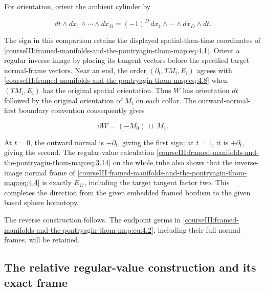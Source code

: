 For orientation, orient the ambient cylinder by

\begin{equation}
dt\wedge dx_1\wedge\cdots\wedge dx_D
   =(-1)^D\,dx_1\wedge\cdots\wedge dx_D\wedge dt.
 \label{courseIII:framed-manifolds-and-the-pontryagin-thom-map:eq:4.8}
\end{equation}

The sign in this comparison retains the displayed spatial-then-time coordinates of \eqref{courseIII:framed-manifolds-and-the-pontryagin-thom-map:eq:4.1}. Orient a regular inverse image by placing its tangent vectors before the specified target normal-frame vectors. Near an end, the order \((\partial_t,TM_i,E_i)\) agrees with \eqref{courseIII:framed-manifolds-and-the-pontryagin-thom-map:eq:4.8} when \((TM_i,E_i)\) has the original spatial orientation. Thus \(W\) has orientation \(dt\) followed by the original orientation of \(M_i\) on each collar. The outward-normal-first boundary convention consequently gives

\begin{equation}
\partial W=(-M_0)\ \sqcup\ M_1.
 \label{courseIII:framed-manifolds-and-the-pontryagin-thom-map:eq:4.9}
\end{equation}

At \(t=0\), the outward normal is \(-\partial_t\), giving the first sign; at \(t=1\), it is \(+\partial_t\), giving the second. The regular-value calculation \eqref{courseIII:framed-manifolds-and-the-pontryagin-thom-map:eq:3.14} on the whole tube also shows that the inverse-image normal frame of \eqref{courseIII:framed-manifolds-and-the-pontryagin-thom-map:eq:4.4} is exactly \(E_W\), including the target tangent factor two. This completes the direction from the given embedded framed bordism to the given based sphere homotopy.

The reverse construction follows. The endpoint germs in \eqref{courseIII:framed-manifolds-and-the-pontryagin-thom-map:eq:4.2}, including their full normal frames, will be retained.

\label{courseIII:framed-manifolds-and-the-pontryagin-thom-map:pt-relative-regular-value}

\subsection{The relative regular-value construction and its exact frame}
\label{courseIII:framed-manifolds-and-the-pontryagin-thom-map:section-5}

\label{courseIII:pontryagin-thom:5}

